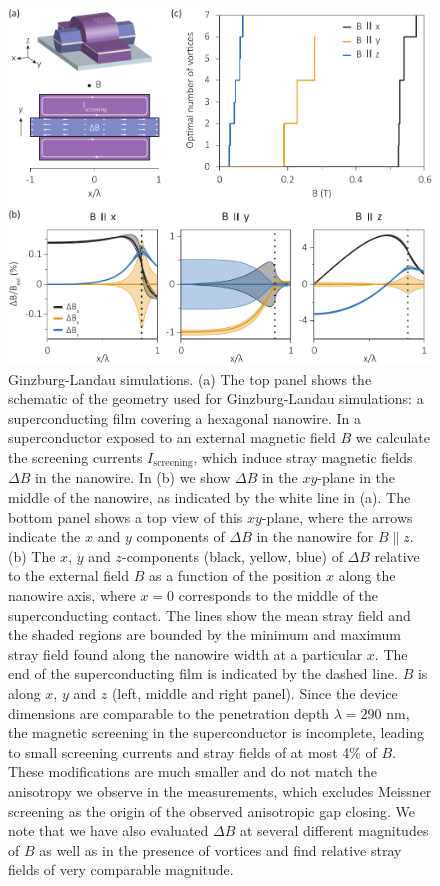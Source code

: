 \begin{figure}
\begin{center}
\centering
\includegraphics[width=0.7\columnwidth]{chapter_spinorbit/figures/SFig2_GL.pdf}
\caption{\label{fig:GL}
Ginzburg-Landau simulations.
(a) The top panel shows the schematic of the geometry used for Ginzburg-Landau simulations: a superconducting film covering a hexagonal nanowire.
In a superconductor exposed to an external magnetic field $B$ we calculate the screening currents $I_{\mathrm{screening}}$, which induce stray magnetic fields $\Delta B$ in the nanowire.
In (b) we show $\Delta B$ in the $xy$-plane in the middle of the nanowire, as indicated by the white line in (a).
The bottom panel shows a top view of this $xy$-plane, where the arrows indicate the $x$ and $y$ components of $\Delta B$ in the nanowire for $B \parallel z$.
(b) The $x$, $y$ and $z$-components (black, yellow, blue) of $\Delta B$ relative to the external field $B$ as a function of the position $x$ along the nanowire axis, where $x = 0$ corresponds to the middle of the superconducting contact.
The lines show the mean stray field and the shaded regions are bounded by the minimum and maximum stray field found along the nanowire width at a particular $x$.
 The end of the superconducting film is indicated by the dashed line.
 $B$ is along $x$, $y$ and $z$ (left, middle and right panel).
Since the device dimensions are comparable to the penetration depth $\lambda = 290$ nm, the magnetic screening in the superconductor is incomplete, leading to small screening currents and stray fields of at most 4\% of $B$.
These modifications are much smaller and do not match the anisotropy we observe in the measurements, which excludes Meissner screening as the origin of the observed anisotropic gap closing.
We note that we have also evaluated $\Delta B$ at several different magnitudes of $B$ as well as in the presence of vortices and find relative stray fields of very comparable magnitude.
}
\end{center}
\end{figure}
